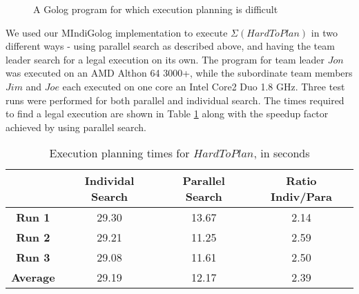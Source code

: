%
\begin{figure}
\begin{centering}
\framebox{%
\parbox[t][1\totalheight]{0.85\columnwidth}{%
\begin{gather*}
\mathbf{proc}\, HardToPlan()\\
\left[AcquireType(Joe,Carrot)\,;\right.\\
AcquireType(Jon,Sugar)\,;\\
AcquireType(Jim,Lettuce)\,;\\
AcquireType(Joe,Flour)\,;\\
AcquireType(Jon,Flour)\,;\\
HasObject(Jon,Carrot3)?\,;\\
HasObject(Joe,Flour5)?\,;\\
\left.\, HasObject(Jon,Sugar4)?\right]\,\,\mathbf{end}\\
\\\mathbf{proc}\, AcquireType(Agt,Type)\\
\pi(obj,\, IsType(obj,Type)?\,;\\
\left.\, acquire(Agt,obj)))\right]\,\,\mathbf{end}\end{gather*}
}} 
\par\end{centering}

\caption{A Golog program for which execution planning is difficult\label{fig:MIndiGolog:HardToPlan}}

\end{figure}


We used our MIndiGolog implementation to execute $\Sigma(HardToPlan)$
in two different ways - using parallel search as described above,
and having the team leader search for a legal execution on its own.
The program for team leader $Jon$ was executed on an AMD Althon 64
3000+, while the subordinate team members $Jim$ and $Joe$ each executed
on one core an Intel Core2 Duo 1.8 GHz.
Three test runs were performed for both parallel
and individual search. The times required to find a legal execution
are shown in Table \ref{tab:MIndiGolog:Execution-planning-times}
along with the speedup factor achieved by using parallel search.

%
\begin{table}
\begin{centering}
\begin{tabular}{|c|c|c|c|}
\hline 
 & \textbf{Individal Search}  & \textbf{Parallel Search}  & \textbf{Ratio Indiv/Para}\tabularnewline
\hline
\hline 
\textbf{Run 1}  & 29.30  & 13.67  & 2.14\tabularnewline
\hline 
\textbf{Run 2}  & 29.21  & 11.25  & 2.59\tabularnewline
\hline 
\textbf{Run 3}  & 29.08  & 11.61  & 2.50\tabularnewline
\hline
\hline 
\textbf{Average}  & 29.19  & 12.17  & 2.39\tabularnewline
\hline
\end{tabular}
\par\end{centering}

\caption{Execution planning times for $HardToPlan$, in seconds\label{tab:MIndiGolog:Execution-planning-times}}

\end{table}


